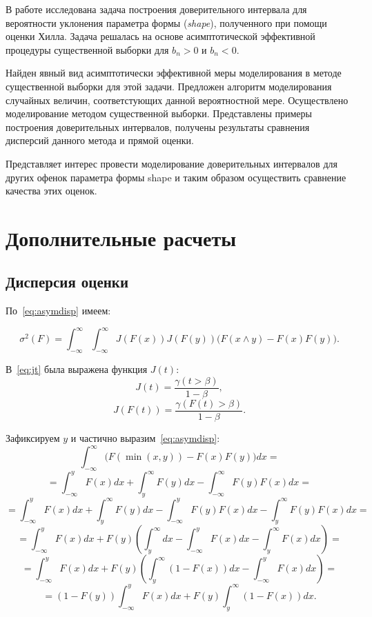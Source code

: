 \documentclass[12pt, specialist, subf, substylefile = spbu.rtx]{disser}
\begin{document}

\conclusion

В работе исследована задача построения доверительного интервала для вероятности уклонения параметра формы (\textit{shape}), полученного при помощи оценки Хилла. Задача решалась на основе асимптотической эффективной процедуры существенной выборки для $b_n>0$ и $b_n<0$.

Найден явный вид асимптотически эффективной меры моделирования в методе существенной выборки для этой задачи. Предложен алгоритм моделирования случайных величин, соответстующих данной вероятностной мере. Осуществлено моделирование методом существенной выборки. Представлены примеры построения доверительных интервалов, получены результаты сравнения дисперсий данного метода и прямой оценки. 

Представляет интерес провести моделирование доверительных интервалов для других офенок параметра формы shape и таким образом осуществить сравнение качества этих оценок.





\newpage
\appendix
\chapter{Дополнительные расчеты}\label{sec:app_disp}

\section{Дисперсия оценки}

По~\eqref{eq:asymdisp} имеем:

$$
\sigma^2(F)= \int_{-\infty}^\infty \int_{-\infty}^\infty J(F(x)) J(F(y))\big( F(x \wedge y)-F(x)F(y)\big).
$$

В~\eqref{eq:jt} была выражена функция $J(t)$:
$$
J(t)=\frac{\gamma(t>\beta)}{1-\beta},
$$
$$
J(F(t))=\frac{\gamma(F(t)>\beta)}{1-\beta}.
$$

Зафиксируем $y$ и частично выразим~\eqref{eq:asymdisp}:
$$
\int_{-\infty}^\infty \big( F(\min(x, y))-F(x)F(y)\big)dx = 
$$
$$
=\int_{-\infty}^y F(x)dx + \int_y^\infty F(y)dx - 
\int_{-\infty}^\infty F(y)F(x)dx =
$$
$$
=\int_{-\infty}^y F(x)dx + \int_y^\infty F(y)dx - 
\int_{-\infty}^y F(y)F(x)dx -
\int_y^\infty F(y)F(x)dx =
$$
$$
=\int_{-\infty}^y F(x)dx + F(y) \left(
\int_y^\infty dx - 
\int_{-\infty}^y F(x)dx -
\int_y^\infty F(x)dx
\right)=
$$
$$
=
\int_{-\infty}^y F(x)dx + F(y) \left(
\int_y^\infty (1-F(x))dx - 
\int_{-\infty}^y F(x)dx
\right)=
$$
$$
=(1-F(y))\int_{-\infty}^y F(x)dx + 
F(y)\int_y^\infty (1-F(x))dx.
$$
\end{document}
